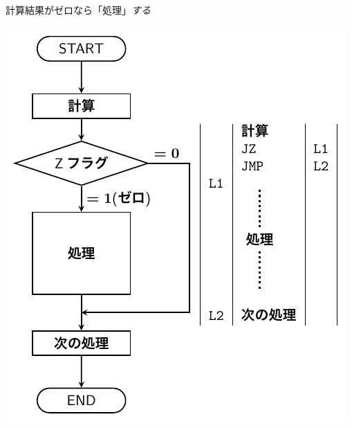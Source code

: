 \documentclass{beamer}                 %
\begin{document}
\begin{frame}
\begin{minipage}{0.5\columnwidth}
\begin{itembox}[l]{\footnotesize 計算結果がゼロなら「処理」\emph{する}}
      \centerline{\includegraphics[scale=0.6]{../Tikz/flow2A.pdf}}
    \end{itembox}
  \end{minipage}
  \vfill
\end{frame}
\end{document}
